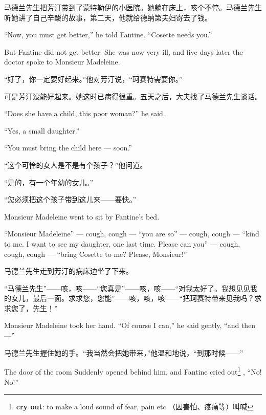 \documentclass[fontset=ubuntu, zihao=5]{ctexart}
\begin{document}
\begin{paracol}{2}
  \switchcolumn

  马德兰先生把芳汀带到了蒙特勒伊的小医院。她躺在床上，咳个不停。马德兰先生听她讲了自己辛酸的故事，第二天，他就给德纳第夫妇寄去了钱。

  \switchcolumn*

  ``Now, you must get better,'' he told Fantine. ``Cosette needs you.''


  But Fantine did not get better. She was now very ill, and five days later the doctor spoke to Monsieur Madeleine.

  \switchcolumn

  “好了，你一定要好起来。”他对芳汀说，“珂赛特需要你。”


  可是芳汀没能好起来。她这时已病得很重。五天之后，大夫找了马德兰先生谈话。

  \switchcolumn*

  ``Does she have a child, this poor woman?'' he said.


  ``Yes, a small daughter.''


  ``You must bring the child here --- soon.''

  \switchcolumn

  “这个可怜的女人是不是有个孩子？”他问道。


  “是的，有一个年幼的女儿。”


  “您必须把这个孩子带到这儿来——要快。”

  \switchcolumn*

  Monsieur Madeleine went to sit by Fantine's bed.

  ``Monsieur Madeleine'' --- cough, cough --- ``you are so'' --- cough, cough --- ``kind to me. I want to see my daughter, one last time. Please can you'' --- cough, cough, cough --- ``bring Cosette to me? Please, Monsieur!''

  \switchcolumn

  马德兰先生走到芳汀的病床边坐了下来。


  “马德兰先生”——咳，咳——“您真是”——咳，咳——“对我太好了。我想见见我的女儿，最后一面。求求您，您能”——咳，咳，咳——“把珂赛特带来见我吗？求求您了，先生！”

  \switchcolumn*

  Monsieur Madeleine took her hand. ``Of course I can,'' he said gently, ``and
  then ---''

  \switchcolumn

  马德兰先生握住她的手。“我当然会把她带来，”他温和地说，“到那时候——”

  \switchcolumn*

  The door of the room Suddenly opened behind him, and Fantine cried out\footnote{\textbf{cry out}: to make a loud sound of fear, pain etc （因害怕、疼痛等）叫喊}
  , ``No! No!''


\end{paracol}
\end{document}

